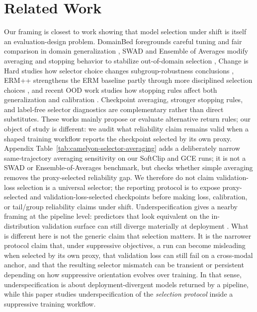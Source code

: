 \section{Related Work}
Our framing is closest to work showing that model selection under shift is itself an evaluation-design problem.
DomainBed foregrounds careful tuning and fair comparison in domain generalization \citep{gulrajani2020domainbed}, SWAD and Ensemble of Averages modify averaging and stopping behavior to stabilize out-of-domain selection \citep{cha2021swad,arpit2022ensembleaverages}, Change is Hard studies how selector choice changes subgroup-robustness conclusions \citep{yang2023changeishard}, ERM++ strengthens the ERM baseline partly through more disciplined selection choices \citep{teterwak2025ermpp}, and recent OOD work studies how stopping rules affect both generalization and calibration \citep{naganuma2025pretrainedmodelselection,berta2025refinethencalibrate}.
Checkpoint averaging, stronger stopping rules, and label-free selector diagnostics are complementary rather than direct substitutes.
These works mainly propose or evaluate alternative return rules; our object of study is different: we audit what reliability claim remains valid when a shaped training workflow reports the checkpoint selected by its own proxy.
Appendix Table~\ref{tab:camelyon-selector-averaging} adds a deliberately narrow same-trajectory averaging sensitivity on our SoftClip and GCE runs; it is not a SWAD or Ensemble-of-Averages benchmark, but checks whether simple averaging removes the proxy-selected reliability gap.
We therefore do not claim validation-loss selection is a universal selector; the reporting protocol is to expose proxy-selected and validation-loss-selected checkpoints before making loss, calibration, or tail/group reliability claims under shift.
Underspecification gives a nearby framing at the pipeline level: predictors that look equivalent on the in-distribution validation surface can still diverge materially at deployment \citep{damour2022underspecification}.
What is different here is not the generic claim that selection matters.
It is the narrower protocol claim that, under suppressive objectives, a run can become misleading when selected by its own proxy, that validation loss can still fail on a cross-modal anchor, and that the resulting selector mismatch can be transient or persistent depending on how suppressive orientation evolves over training.
In that sense, underspecification is about deployment-divergent models returned by a pipeline, while this paper studies underspecification of the \emph{selection protocol} inside a suppressive training workflow.

